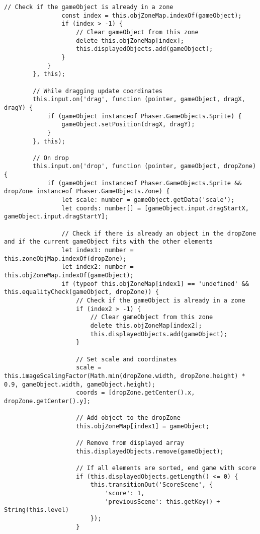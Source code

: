 \begin{lstlisting}[style=TypeScript, caption={restrictedSortingScene.ts}]
                // Check if the gameObject is already in a zone
                const index = this.objZoneMap.indexOf(gameObject);
                if (index > -1) {
                    // Clear gameObject from this zone
                    delete this.objZoneMap[index];
                    this.displayedObjects.add(gameObject);
                }
            }
        }, this);

        // While dragging update coordinates
        this.input.on('drag', function (pointer, gameObject, dragX, dragY) {
            if (gameObject instanceof Phaser.GameObjects.Sprite) {
                gameObject.setPosition(dragX, dragY);
            }
        }, this);

        // On drop
        this.input.on('drop', function (pointer, gameObject, dropZone) {
            if (gameObject instanceof Phaser.GameObjects.Sprite && dropZone instanceof Phaser.GameObjects.Zone) {
                let scale: number = gameObject.getData('scale');
                let coords: number[] = [gameObject.input.dragStartX, gameObject.input.dragStartY];

                // Check if there is already an object in the dropZone and if the current gameObject fits with the other elements
                let index1: number = this.zoneObjMap.indexOf(dropZone);
                let index2: number = this.objZoneMap.indexOf(gameObject);
                if (typeof this.objZoneMap[index1] == 'undefined' && this.equalityCheck(gameObject, dropZone)) {
                    // Check if the gameObject is already in a zone
                    if (index2 > -1) {
                        // Clear gameObject from this zone
                        delete this.objZoneMap[index2];
                        this.displayedObjects.add(gameObject);
                    }

                    // Set scale and coordinates
                    scale = this.imageScalingFactor(Math.min(dropZone.width, dropZone.height) * 0.9, gameObject.width, gameObject.height);
                    coords = [dropZone.getCenter().x, dropZone.getCenter().y];

                    // Add object to the dropZone
                    this.objZoneMap[index1] = gameObject;

                    // Remove from displayed array
                    this.displayedObjects.remove(gameObject);

                    // If all elements are sorted, end game with score
                    if (this.displayedObjects.getLength() <= 0) {
                        this.transitionOut('ScoreScene', {
                            'score': 1,
                            'previousScene': this.getKey() + String(this.level)
                        });
                    }



\end{lstlisting}
